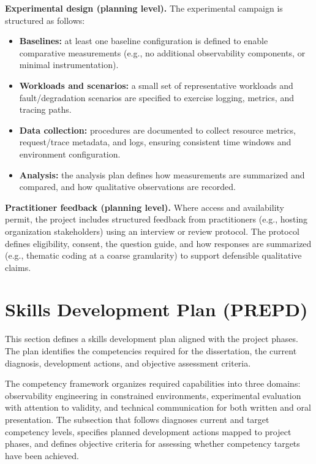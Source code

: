 		\textbf{Experimental design (planning level).} The experimental campaign is structured as follows:
\begin{itemize}
    \item \textbf{Baselines:} at least one baseline configuration is defined to enable comparative measurements (e.g., no additional observability components, or minimal instrumentation).
    \item \textbf{Workloads and scenarios:} a small set of representative workloads and fault/degradation scenarios are specified to exercise logging, metrics, and tracing paths.
    \item \textbf{Data collection:} procedures are documented to collect resource metrics, request/trace metadata, and logs, ensuring consistent time windows and environment configuration.
    \item \textbf{Analysis:} the analysis plan defines how measurements are summarized and compared, and how qualitative observations are recorded.
\end{itemize}

		\textbf{Practitioner feedback (planning level).} Where access and availability permit, the project includes structured feedback from practitioners (e.g., hosting organization stakeholders) using an interview or review protocol. The protocol defines eligibility, consent, the question guide, and how responses are summarized (e.g., thematic coding at a coarse granularity) to support defensible qualitative claims.

\section{Skills Development Plan (PREPD)}
\label{sec:ch3_skills}

This section defines a skills development plan aligned with the project phases. The plan identifies the competencies required for the dissertation, the current diagnosis, development actions, and objective assessment criteria.

The competency framework organizes required capabilities into three domains: observability engineering in constrained environments, experimental evaluation with attention to validity, and technical communication for both written and oral presentation. The subsection that follows diagnoses current and target competency levels, specifies planned development actions mapped to project phases, and defines objective criteria for assessing whether competency targets have been achieved.

